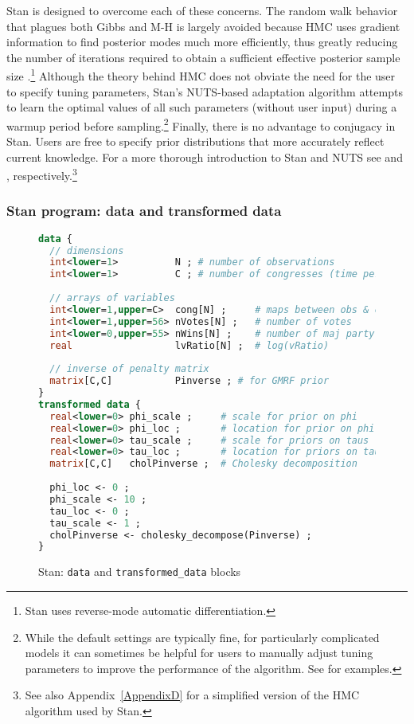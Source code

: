 Stan is designed to overcome each of these concerns. The random walk behavior that plagues both Gibbs and M-H is largely avoided because HMC uses gradient information to find posterior modes much more efficiently, thus greatly reducing the number of iterations required to obtain a sufficient effective posterior sample size .\footnote{Stan uses reverse-mode automatic differentiation.}  Although the theory behind HMC does not obviate the need for the user to specify tuning parameters, Stan's NUTS-based adaptation algorithm attempts to learn the optimal values of all such parameters (without user input) during a warmup period before sampling.\footnote{While the default settings are typically fine, for particularly complicated models it can sometimes be helpful for users to manually adjust tuning parameters to improve the performance of the algorithm. See  for examples.} Finally, there is no advantage to conjugacy in Stan. Users are free to specify prior distributions that more accurately reflect current knowledge. For a more thorough introduction to Stan and NUTS see  and , respectively.\footnote{See also Appendix~\ref{AppendixD} for a simplified version of the HMC algorithm used by Stan.}

\subsubsection{Stan program: data and transformed data}

\begin{figure}[t]
\begin{lstlisting}[language=Stan, frame=trBL]
data {
  // dimensions 
  int<lower=1>          N ; # number of observations 
  int<lower=1>          C ; # number of congresses (time periods)
  
  // arrays of variables 
  int<lower=1,upper=C>  cong[N] ;     # maps between obs & congress
  int<lower=1,upper=56> nVotes[N] ;   # number of votes
  int<lower=0,upper=55> nWins[N] ;    # number of maj party victories
  real                  lvRatio[N] ;  # log(vRatio)
  
  // inverse of penalty matrix 
  matrix[C,C]           Pinverse ; # for GMRF prior
}
transformed data {
  real<lower=0> phi_scale ;     # scale for prior on phi
  real<lower=0> phi_loc ;       # location for prior on phi
  real<lower=0> tau_scale ;     # scale for priors on taus
  real<lower=0> tau_loc ;       # location for priors on taus
  matrix[C,C]   cholPinverse ;  # Cholesky decomposition 
  
  phi_loc <- 0 ;
  phi_scale <- 10 ;
  tau_loc <- 0 ;
  tau_scale <- 1 ;
  cholPinverse <- cholesky_decompose(Pinverse) ;
}
\end{lstlisting}
\caption{Stan: {\tt data} and {\tt transformed\_data} blocks}
\label{stan_data}
\end{figure}

